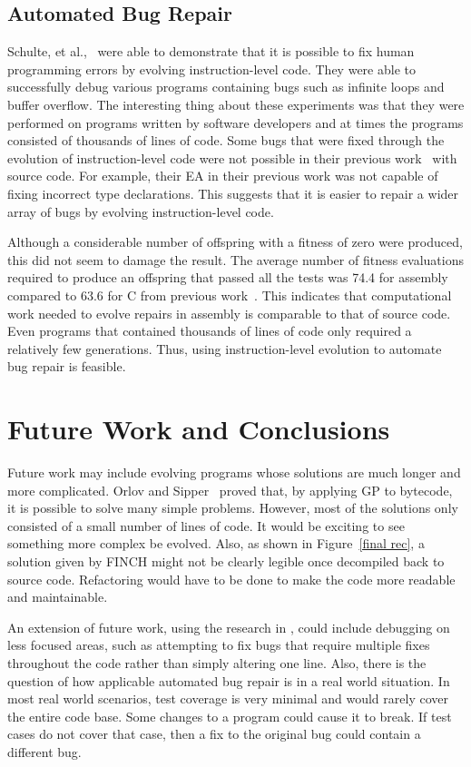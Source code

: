 \documentclass{sig-alternate}
\begin{document}
\subsection{Automated Bug Repair}

Schulte, et al.,~\cite{Assembly:2010} were able to demonstrate that it is possible to fix human programming errors by evolving instruction-level code. They were able to successfully debug various programs containing bugs such as infinite loops and buffer overflow. The interesting thing about these experiments was that they were performed on programs written by software developers and at times the programs consisted of thousands of lines of code. Some bugs that were fixed through the evolution of instruction-level code were not possible in their previous work~\cite{Forrest:2009} with source code. For example, their EA in their previous work was not capable of fixing incorrect type declarations. This suggests that it is easier to repair a wider array of bugs by evolving instruction-level code.

Although a considerable number of offspring with a fitness of zero were produced, this did not seem to damage the result. The average number of fitness evaluations required to produce an offspring that passed all the tests was 74.4 for assembly compared to 63.6 for C from previous work~\cite{Forrest:2009}. This indicates that computational work needed to evolve repairs in assembly is comparable to that of source code. Even programs that contained thousands of lines of code only required a relatively few generations. Thus, using instruction-level evolution to automate bug repair is feasible.
 

\section{Future Work and Conclusions}

Future work may include evolving programs whose solutions are much longer and more complicated. Orlov and Sipper~\cite{FINCH:2011} proved that, by applying GP to bytecode, it is possible to solve many simple problems. However, most of the solutions only consisted of a small number of lines of code. It would be exciting to see something more complex be evolved. Also, as shown in Figure~\ref{final rec}, a solution given by FINCH might not be clearly legible once decompiled back to source code. Refactoring would have to be done to make the code more readable and maintainable.

An extension of future work, using the research in \cite{Assembly:2010}, could include debugging on less focused areas, such as attempting to fix bugs that require multiple fixes throughout the code rather than simply altering one line. Also, there is the question of how applicable automated bug repair is in a real world situation. In most real world scenarios, test coverage is very minimal and would rarely cover the entire code base. Some changes to a program could cause it to break. If test cases do not cover that case, then a fix to the original bug could contain a different bug. 
\end{document}
